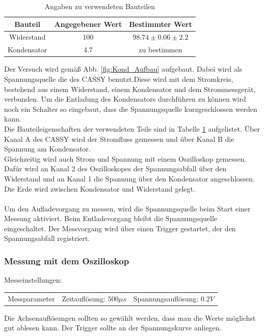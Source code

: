 \documentclass[12pt,a4paper]{article}
\begin{document}
\begin{table}[H]
\begin{center}
\begin{tabular}{|c|c|c|}
\hline 
Bauteil & Angegebener Wert & Bestimmter Wert \\ 
\hline 
Widerstand & 100 & $98.74\pm 0.06\pm2.2$ \\ 
\hline 
Kondensator & 4.7 & zu bestimmen \\ 
\hline 
\end{tabular} 
\end{center}
\caption{Angaben zu verwendeten Bauteilen}
\label{tab:Kond_Hersteller} 
\end{table}

Der Versuch wird gemäß Abb. \ref{fig:Kond_Aufbau} aufgebaut. Dabei wird als Spannungsquelle die des CASSY benutzt.Diese wird mit dem Stromkreis, bestehend aus einem Widerstand, einem Kondensator und dem Strommessgerät, verbunden. Um die Entladung des Kondensators durchführen zu können wird noch ein Schalter so eingebaut, dass die Spannungsquelle kurzgeschlossen werden kann.\\ 
Die Bauteileigenschaften  der verwendeten Teile sind in Tabelle \ref{tab:Kond_Hersteller} aufgelistet.
Über Kanal A des CASSY wird der Stromfluss gemessen und über Kanal B die Spannung am Kondensator.\\
Gleichzeitig wird auch Strom und Spannung mit einem Oszilloskop gemessen. Dafür wird an Kanal 2 des Oszilloskopes der Spannungsabfall über den Widerstand und an Kanal 1 die Spannung über den Kondensator angeschlossen. Die Erde wird zwischen Kondensator und Widerstand gelegt.\\
\\
Um den Aufladevorgang zu messen, wird die Spannungsquelle beim Start einer Messung aktiviert.
Beim Entladevorgang bleibt die Spannungsquelle eingeschaltet. Der Messvorgang wird über einen Trigger gestartet, der den Spannungsabfall registriert.
\subsubsection{Messung mit dem Oszilloskop}
Messeinstellungen:
\begin{tabular}{c c c}
Messparameter & Zeitauflösung: $500\mu s$  & Spannungsauflösung: $0.2V$ \\ 
\end{tabular} 
Die Achsenauflösungen sollten so gewählt werden, dass man die Werte möglichst gut ablesen kann.
Der Trigger sollte an der Spannungskurve anliegen.
\end{document}
